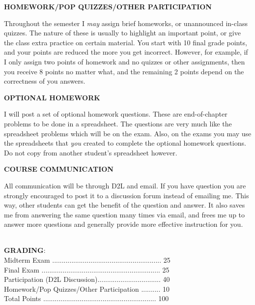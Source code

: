 \documentclass{article}
\begin{document}
\clearpage

\begin{center}
{\bf HOMEWORK/POP QUIZZES/OTHER PARTICIPATION}
\end{center}
Throughout the semester I \emph{may} assign brief homeworks, or unannounced in-class quizzes.  The nature of these is usually to highlight an important point, or give the class extra practice on certain material.  You start with 10 final grade points, and your points are reduced the more you get incorrect.  However, for example, if I only assign two points of homework and no quizzes or other assignments, then you receive 8 points no matter what, and the remaining 2 points depend on the correctness of you answers.  
\begin{center}
{\bf OPTIONAL HOMEWORK}
\end{center}  
I will post a set of optional homework questions.  These are end-of-chapter problems to be done in a spreadsheet.  The questions are very much like the spreadsheet problems which will be on the exam.  Also, on the exams you may use the spreadsheets that \emph{you} created to complete the optional homework questions.  Do not copy from another student's spreadsheet however.
\begin{center}
{\bf COURSE COMMUNICATION}
\end{center}  
All communication will be through D2L and email. If you have question you are strongly encouraged to post it to a discussion forum instead of emailing me.  This way, other students can get the benefit of the question and answer.  It also saves me from answering the same question many times via email, and frees me up to answer more questions and generally provide more effective instruction for you.  \\
\\
\begin{center}
{\bf GRADING}:\\
Midterm Exam .........................................................   25\\

Final Exam ..............................................................  25\\


Participation (D2L Discussion).................................   40\\

Homework/Pop Quizzes/Other Participation ..........   10\\

Total Points ...........................................................  100\\
\end{center}
\end{document}
